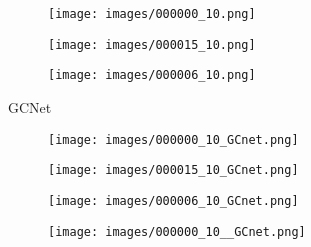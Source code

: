 \documentclass[10pt,twocolumn,letterpaper]{article}
\begin{document}
\begin{figure*}[htpb]
	\captionsetup[subfigure]{labelformat=empty}
	\centering
	\begin{center}
		\begin{minipage}[c]{0.01\textwidth}
			\begin{turn}{90}\footnotesize{}\end{turn}			
		\end{minipage}
		\begin{minipage}[c]{0.985\textwidth}
			\begin{subfigure}[c]{0.33\linewidth}
				\texttt{[image: images/000000\_10.png]}
			\end{subfigure}
			\hspace{-0.5\baselineskip}
			\hfill
			\begin{subfigure}[c]{0.33\linewidth}
				\texttt{[image: images/000015\_10.png]}
			\end{subfigure}
			\hspace{-0.5\baselineskip}
			\hfill
			\begin{subfigure}[c]{0.33\linewidth}
				\texttt{[image: images/000006\_10.png]}
			\end{subfigure}
		\end{minipage}
\begin{minipage}[c]{0.01\textwidth}
			\begin{turn}{90}\footnotesize{GCNet \cite{kendall2017end}}\end{turn}			
		\end{minipage}
		\begin{minipage}[c]{0.985\textwidth}
			\begin{subfigure}[c]{0.33\linewidth}
				\texttt{[image: images/000000\_10\_GCnet.png]}
			\end{subfigure}
			\hspace{-0.5\baselineskip}
			\hfill
			\begin{subfigure}[c]{0.33\linewidth}
				\texttt{[image: images/000015\_10\_GCnet.png]}
			\end{subfigure}
			\hspace{-0.5\baselineskip}
			\hfill
			\begin{subfigure}[c]{0.33\linewidth}
				\texttt{[image: images/000006\_10\_GCnet.png]}
			\end{subfigure}
			\begin{subfigure}[c]{0.33\linewidth}
				\texttt{[image: images/000000\_10\_\_GCnet.png]}

\end{subfigure}
\end{minipage}
\end{center}
\end{figure*}
\end{document}
